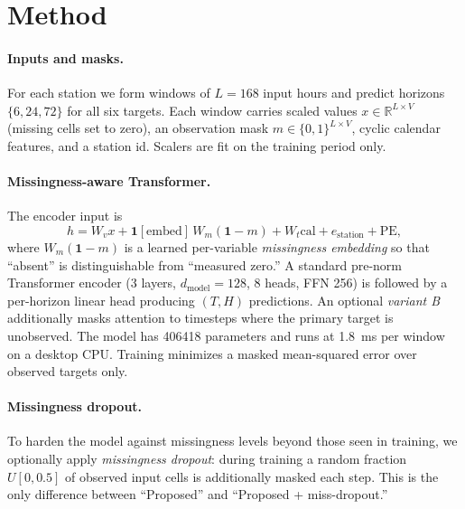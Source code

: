 \documentclass[review,3p,times]{elsarticle}
\begin{document}


\section{Method}
\label{sec:method}

\paragraph{Inputs and masks.}
For each station we form windows of $L=168$ input hours and predict horizons
$\{6,24,72\}$ for all six targets. Each window carries scaled values
$x\in\mathbb{R}^{L\times V}$ (missing cells set to zero), an observation mask
$m\in\{0,1\}^{L\times V}$, cyclic calendar features, and a station id. Scalers
are fit on the training period only.

\paragraph{Missingness-aware Transformer.}
The encoder input is
\begin{equation}
h = W_v x + \mathbf{1}[\text{embed}]\,W_m(\mathbf{1}-m) + W_t \text{cal} + e_{\text{station}} + \text{PE},
\end{equation}
where $W_m(\mathbf{1}-m)$ is a learned per-variable \emph{missingness embedding}
so that ``absent'' is distinguishable from ``measured zero.'' A standard pre-norm
Transformer encoder \citep{vaswani2017attention} (3 layers,
$d_{\text{model}}=128$, 8 heads, FFN 256) is followed by a per-horizon linear
head producing $(T,H)$ predictions. An optional
\emph{variant B} additionally masks attention to timesteps where the primary
target is unobserved. The model has \num{406418} parameters and runs at
\SI{1.8}{\milli\second} per window on a desktop CPU. Training minimizes a masked
mean-squared error over observed targets only.

\paragraph{Missingness dropout.}
To harden the model against missingness levels beyond those seen in training, we
optionally apply \emph{missingness dropout}: during training a random fraction
$U[0,0.5]$ of observed input cells is additionally masked each step. This is the
only difference between ``Proposed'' and ``Proposed + miss-dropout.''
\end{document}
